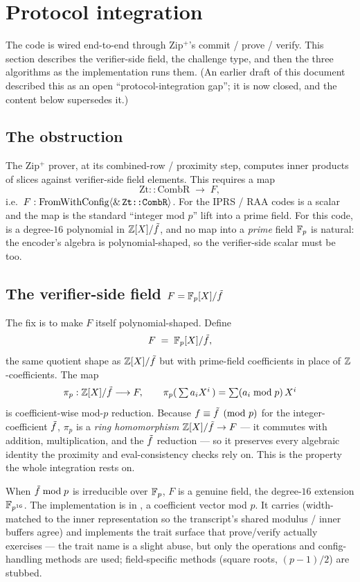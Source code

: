 \section{Protocol integration}
\label{sec:protocol-integration}

The code is wired end-to-end through Zip$^+$'s commit / prove / verify.
This section describes the verifier-side field, the challenge type, and
then the three algorithms as the implementation runs them. (An earlier
draft of this document described this as an open
``protocol-integration gap''; it is now closed, and the content below
supersedes it.)

\subsection{The obstruction}

The Zip$^+$ prover, at its combined-row / proximity step, computes
inner products of  slices against verifier-side
field elements. This requires a map
\[
  \mathrm{Zt::CombR} \;\longrightarrow\; F,
\]
i.e.\ $F : \mathrm{FromWithConfig}\langle \&\,\texttt{Zt::CombR}\rangle$.
For the IPRS / RAA codes  is a scalar  and
the map is the standard ``integer mod $p$'' lift into a prime field.
For this code,  is a degree-$16$ polynomial in $\mathbb{Z}[X]/\tilde f$,
and no map into a \emph{prime} field $\mathbb{F}_p$ is natural: the encoder's
algebra is polynomial-shaped, so the verifier-side scalar must be too.

\subsection{The verifier-side field $F = \mathbb{F}_p[X]/\tilde f$}
\label{sec:verifier-field}

The fix is to make $F$ itself polynomial-shaped. Define
\[
  F \;=\; \mathbb{F}_p[X]/\tilde f,
\]
the same quotient shape as $\mathbb{Z}[X]/\tilde f$ but with prime-field coefficients
in place of $\mathbb{Z}$-coefficients. The map
\[
  \pi_p : \mathbb{Z}[X]/\tilde f \longrightarrow F, \qquad
  \pi_p(\,\textstyle\sum a_i X^i\,) = \sum (a_i \bmod p)\, X^i
\]
is coefficient-wise mod-$p$ reduction. Because $f \equiv \tilde f
\pmod p$ for the integer-coefficient $\tilde f$, $\pi_p$ is a
\emph{ring homomorphism} $\mathbb{Z}[X]/\tilde f \to F$ --- it commutes with addition,
multiplication, and the $\tilde f$ reduction --- so it preserves every
algebraic identity the proximity and eval-consistency checks rely on.
This is the property the whole integration rests on.

When $\tilde f \bmod p$ is irreducible over $\mathbb{F}_p$, $F$ is a genuine
field, the degree-$16$ extension $\mathbb{F}_{p^{16}}$. The implementation
is  in , a
\code{[u64; 16]} coefficient vector mod $p$. It carries
 (width-matched to the inner
representation so the transcript's shared modulus / inner buffers
agree) and implements the  trait surface that
prove/verify actually exercises --- the trait name is a slight abuse,
but only the  operations and config-handling methods are
used; field-specific methods (square roots, $(p-1)/2$) are stubbed.

